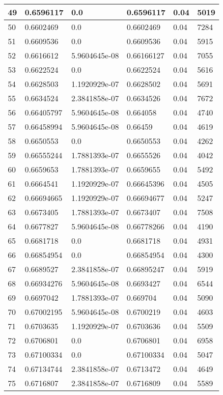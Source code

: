 \begin{longtable}{|l|l|l|l|l|l|}
49 & 0.6596117 & 0.0 & 0.6596117 & 0.04 & 5019 \\ \hline 
50 & 0.6602469 & 0.0 & 0.6602469 & 0.04 & 7284 \\ \hline 
51 & 0.6609536 & 0.0 & 0.6609536 & 0.04 & 5915 \\ \hline 
52 & 0.6616612 & 5.9604645e-08 & 0.66166127 & 0.04 & 7055 \\ \hline 
53 & 0.6622524 & 0.0 & 0.6622524 & 0.04 & 5616 \\ \hline 
54 & 0.6628503 & 1.1920929e-07 & 0.6628502 & 0.04 & 5691 \\ \hline 
55 & 0.6634524 & 2.3841858e-07 & 0.6634526 & 0.04 & 7672 \\ \hline 
56 & 0.66405797 & 5.9604645e-08 & 0.664058 & 0.04 & 4740 \\ \hline 
57 & 0.66458994 & 5.9604645e-08 & 0.66459 & 0.04 & 4619 \\ \hline 
58 & 0.6650553 & 0.0 & 0.6650553 & 0.04 & 4262 \\ \hline 
59 & 0.66555244 & 1.7881393e-07 & 0.6655526 & 0.04 & 4042 \\ \hline 
60 & 0.6659653 & 1.7881393e-07 & 0.6659655 & 0.04 & 5492 \\ \hline 
61 & 0.6664541 & 1.1920929e-07 & 0.66645396 & 0.04 & 4505 \\ \hline 
62 & 0.66694665 & 1.1920929e-07 & 0.66694677 & 0.04 & 5247 \\ \hline 
63 & 0.6673405 & 1.7881393e-07 & 0.6673407 & 0.04 & 7508 \\ \hline 
64 & 0.6677827 & 5.9604645e-08 & 0.66778266 & 0.04 & 4190 \\ \hline 
65 & 0.6681718 & 0.0 & 0.6681718 & 0.04 & 4931 \\ \hline 
66 & 0.66854954 & 0.0 & 0.66854954 & 0.04 & 4300 \\ \hline 
67 & 0.6689527 & 2.3841858e-07 & 0.66895247 & 0.04 & 5919 \\ \hline 
68 & 0.66934276 & 5.9604645e-08 & 0.6693427 & 0.04 & 6544 \\ \hline 
69 & 0.6697042 & 1.7881393e-07 & 0.669704 & 0.04 & 5090 \\ \hline 
70 & 0.67002195 & 5.9604645e-08 & 0.6700219 & 0.04 & 4603 \\ \hline 
71 & 0.6703635 & 1.1920929e-07 & 0.6703636 & 0.04 & 5509 \\ \hline 
72 & 0.6706801 & 0.0 & 0.6706801 & 0.04 & 6958 \\ \hline 
73 & 0.67100334 & 0.0 & 0.67100334 & 0.04 & 5047 \\ \hline 
74 & 0.67134744 & 2.3841858e-07 & 0.6713472 & 0.04 & 4649 \\ \hline 
75 & 0.6716807 & 2.3841858e-07 & 0.6716809 & 0.04 & 5589 \\ \hline 
\end{longtable}